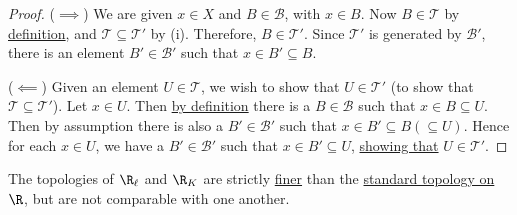 \begin{proof}
  ($\implies$) We are given $x\in X$ and $B\in\mathcal B$, with $x\in B$. Now
  $B\in\mathcal T$ by \href{e6b5306}{definition}, and $\mathcal
  T\subseteq\mathcal T'$ by (i). Therefore, $B\in\mathcal T'$. Since $\mathcal
  T'$ is generated by $\mathcal B'$, there is an element $B'\in\mathcal B'$ such
  that $x\in B'\subseteq B$.

  ($\impliedby$) Given an element $U\in\mathcal T$, we wish to show that
  $U\in\mathcal T'$ (to show that $\mathcal T\subseteq\mathcal T'$). Let $x\in
  U$. Then \href{e6b5306}{by definition} there is a $B\in\mathcal B$ such that
  $x\in B\subseteq U$. Then by assumption there is also a $B'\in\mathcal B'$
  such that $x\in B'\subseteq B(\subseteq U)$. Hence for each $x\in U$, we have
  a $B'\in\mathcal B'$ such that $x\in B'\subseteq U$, \href{e6b5306}{showing
  that} $U\in\mathcal T'$.
\end{proof}

\label{e1bd9d5}

The topologies of \href{cefed4f}{$\R_\ell$} and \href{ee5d783}{$\R_K$} are
strictly \href{e04d168}{finer} than the \href{ad37a51}{standard topology on
$\R$}, but are not comparable with one another.

